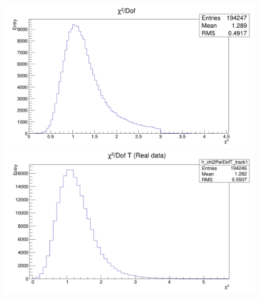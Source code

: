 \begin{figure}[H]    
\begin{minipage}[t]{0.55\textwidth}
\includegraphics[width=\linewidth]{rozdzial6/JPsi_chi2_data.png}
\end{minipage}
\hspace{\fill}
\begin{minipage}[t]{0.55\textwidth}
\includegraphics[width=\linewidth]{rozdzial6/JPsi_chi2T_data.png}
\end{minipage}


\end{figure}
